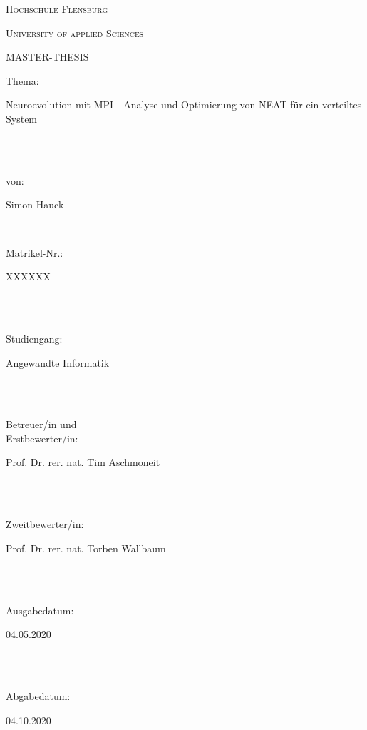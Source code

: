 \documentclass[12pt,a4paper]{scrreprt}
\begin{document}
\begin{titlepage}
	\centerline{{\scshape\LARGE Hochschule Flensburg}}
	\vspace{0.3cm}
	\centerline{{\scshape\LARGE University of applied Sciences}}
	\vspace{3cm}
	\centerline{{\scshape\Huge MASTER-THESIS}}
	\vspace{3cm}
	
	\large 
	{\Large
		\noindent
		\parbox[t]{1.5cm}{Thema:}   \quad\quad \parbox[t]{11cm}{Neuroevolution mit MPI - Analyse und Optimierung von NEAT für ein verteiltes System }\\
		\vspace{0.5cm}\\
		\parbox[t]{1.5cm}{von:}   \quad\quad \parbox[t]{11cm}{Simon Hauck}\\
	} 
	
	\vspace{1.5cm}
	\noindent
	\parbox[t]{6cm}{Matrikel-Nr.:}  \quad\quad \quad\quad  \parbox[t]{11cm}{XXXXXX}\\\\
	\parbox[t]{6cm}{Studiengang:}   \quad\quad \quad\quad \parbox[t]{11cm}{Angewandte Informatik}\\\\
	\parbox[t]{6cm}{Betreuer/in und \\Erstbewerter/in:}    \quad\quad\quad\quad \parbox[t]{11cm}{\vspace{0.2cm}Prof. Dr. rer. nat. Tim Aschmoneit}\\\\
	\parbox[t]{6cm}{Zweitbewerter/in:}   \quad\quad \quad\quad \parbox[t]{11cm}{Prof. Dr. rer. nat. Torben Wallbaum}\\\\
	\parbox[t]{6cm}{Ausgabedatum:}   \quad\quad \quad\quad \parbox[t]{11cm}{04.05.2020}\\\\
	\parbox[t]{6cm}{Abgabedatum:}   \quad\quad \quad\quad \parbox[t]{11cm}{04.10.2020}\\\\
	
\end{titlepage}



\tableofcontents
\listoffigures


\newpage
{}










\end{document}
